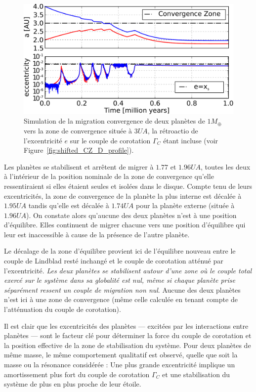 \begin{figure}[htb]
\centering
\includegraphics[width=\linewidth]{figure/shifted/corotation_damping_influence.pdf}
\caption{Simulation de la migration convergence de deux planètes de $1\unit{M_\oplus}$ vers la zone de convergence située à $3\unit{UA}$, la rétroactio de l'excentricité $e$ sur le couple de corotation $\Gamma_C$ étant incluse (voir Figure~\ref{fig:shifted_CZ_D_profile}).}
\label{fig:two-planets}
\end{figure}

Les planètes se stabilisent et arrêtent de migrer à $1.77$ et $1.96\unit{UA}$, toutes les deux à l'intérieur de la position nominale de la zone de convergence qu'elle ressentiraient si elles étaient seules et isolées dans le disque. Compte tenu de leurs excentricités, la zone de convergence de la planète la plus interne est décalée à $1.95\unit{UA}$ tandis qu'elle est décalée à $1.74\unit{UA}$ pour la planète externe (située à $1.96\unit{UA}$). On constate alors qu'aucune des deux planètes n'est à une position d'équilibre. Elles continuent de migrer chacune vers une position d'équilibre qui leur est inaccessible à cause de la présence de l'autre planète. 

Le décalage de la zone d'équilibre provient ici de l'équilibre nouveau entre le couple de Lindblad resté inchangé et le couple de corotation atténué par l'excentricité. \emph{Les deux planètes se stabilisent autour d'une zone où le couple total exercé sur le système dans sa globalité est nul, même si chaque planète prise séparément ressent un couple de migration non nul}. Aucune des deux planètes n'est ici à une zone de convergence (même celle calculée en tenant compte de l'atténuation du couple de corotation). 

Il est clair que les excentricités des planètes --- excitées par les interactions entre planètes --- sont le facteur clé pour déterminer la force du couple de corotation et la position effective de la zone de stabilisation du système. Pour deux planètes de même masse, le même comportement qualitatif est observé, quelle que soit la masse ou la résonance considérée : Une plus grande excentricité implique un amortissement plus fort du couple de corotation $\Gamma_C$ et une stabilisation du système de plus en plus proche de leur étoile. 

